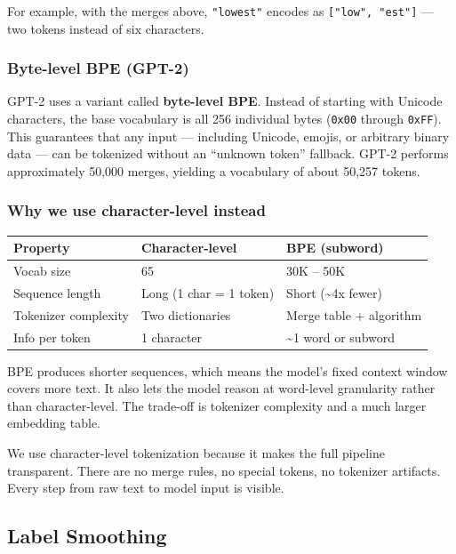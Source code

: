 For example, with the merges above, \texttt{"lowest"} encodes as \texttt{["low", "est"]} --- two tokens instead of six characters.

\subsubsection{Byte-level BPE (GPT-2)}

GPT-2 uses a variant called \textbf{byte-level BPE}. Instead of starting with Unicode characters, the base vocabulary is all 256 individual bytes (\texttt{0x00} through \texttt{0xFF}). This guarantees that any input --- including Unicode, emojis, or arbitrary binary data --- can be tokenized without an ``unknown token'' fallback. GPT-2 performs approximately 50,000 merges, yielding a vocabulary of about 50,257 tokens.

\subsubsection{Why we use character-level instead}

\begin{center}
{\small
\begin{tabular}{lll}
\toprule
Property & Character-level & BPE (subword) \\
\midrule
Vocab size & 65 & 30K -- 50K \\
Sequence length & Long (1 char = 1 token) & Short (\textasciitilde{}4x fewer) \\
Tokenizer complexity & Two dictionaries & Merge table + algorithm \\
Info per token & 1 character & \textasciitilde{}1 word or subword \\
\bottomrule
\end{tabular}
}
\end{center}

BPE produces shorter sequences, which means the model's fixed context window covers more text. It also lets the model reason at word-level granularity rather than character-level. The trade-off is tokenizer complexity and a much larger embedding table.

We use character-level tokenization because it makes the full pipeline transparent. There are no merge rules, no special tokens, no tokenizer artifacts. Every step from raw text to model input is visible.

\subsection{Label Smoothing}

